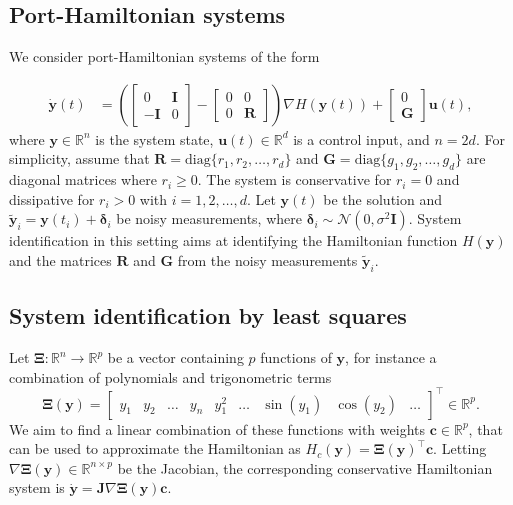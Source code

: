 \documentclass[11pt, a4paper]{article}
\theoremstyle{plain}
\theoremstyle{definition}
\theoremstyle{remark}
\begin{document}
\subsection{Port-Hamiltonian systems}

We consider port-Hamiltonian systems of the form 

\begin{align}
\dot{\mathbf{y}}(t) &= \left( \begin{bmatrix}
0 & \mathbf{I}\\
-\mathbf{I} & 0
\end{bmatrix}
- \begin{bmatrix}
0 & 0\\
0 & \mathbf{R}
\end{bmatrix} \right) \nabla H(\mathbf{y}(t)) + \begin{bmatrix}
0 \\
\mathbf{G}
\end{bmatrix}\mathbf{u}(t),
\label{eq:port_hamiltonian}
\end{align}
where $\mathbf{y} \in \mathbb R^n$ is the system state, $\mathbf{u}(t) \in \mathbb R^d$ is a control input, and $n=2d$. For simplicity, assume that $\mathbf{R} = \mathrm{diag} \{r_1,r_2,\dots,r_d\}$ and $\mathbf{G} = \mathrm{diag}\{g_1,g_2,\dots,g_d\}$ are diagonal matrices where $r_i \geq 0$. The system is conservative for $r_i = 0$ and dissipative for $r_i > 0$ with $i = 1,2,\dots,d$. Let $\mathbf{y}(t)$ be the solution and $\tilde{\mathbf{y}}_i = \mathbf{y}(t_i) + \boldsymbol{\delta}_i$ be noisy measurements, where $\boldsymbol{\delta}_i \sim \mathcal N(0,\sigma^2\mathbf{I})$. System identification in this setting aims at identifying the Hamiltonian function $H(\mathbf{y})$ and the matrices $\mathbf{R}$ and $\mathbf{G}$ from the noisy measurements $\tilde{\mathbf{y}}_i$.

\subsection{System identification by least squares}


Let $\boldsymbol{\Xi} : \mathbb R^n \rightarrow \mathbb R^p$ be a vector containing $p$ functions of $\mathbf{y}$, for instance a combination of polynomials and trigonometric terms 
\begin{equation}
    \boldsymbol{\Xi}(\mathbf{y}) = \begin{bmatrix}
     y_1 & y_2 & \dots & y_n & y_1^2 & \dots & \sin(y_1) & \cos(y_2) & \dots
    \end{bmatrix}^{\top} \in \mathbb R^p.
\end{equation}
We aim to find a linear combination  of these functions with weights $\mathbf{c}\in\mathbb R^p$, that can be used to approximate the Hamiltonian as
    $H_{c}(\mathbf{y}) = \boldsymbol{\Xi}(\mathbf{y})^{\top}\mathbf{c}$.
Letting $\nabla \boldsymbol{\Xi}(\mathbf{y}) \in \mathbb R^{n \times p}$ be the Jacobian, the corresponding conservative Hamiltonian system is $\dot{\mathbf{y}} = \mathbf{J} \nabla \boldsymbol{\Xi}(\mathbf{y})\mathbf{c}$.
\end{document}
